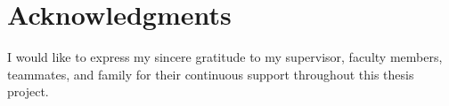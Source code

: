 \chapter*{Acknowledgments}

I would like to express my sincere gratitude to my supervisor, faculty members, teammates, and family for their continuous support throughout this thesis project.
